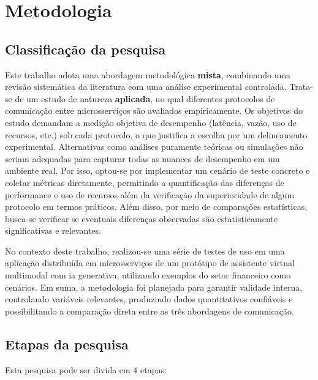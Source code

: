 \chapter{Metodologia}
\label{ch:4metodologia}

\section{Classificação da pesquisa}

Este trabalho adota uma abordagem metodológica \textbf{mista}, combinando uma revisão sistemática da literatura com uma análise experimental controlada. Trata-se de um estudo de natureza \textbf{aplicada}, no qual diferentes protocolos de comunicação entre microsserviços são avaliados empiricamente. Os objetivos do estudo demandam a medição objetiva de desempenho (latência, vazão, uso de recursos, etc.) sob cada protocolo, o que justifica a escolha por um delineamento experimental. Alternativas como análises puramente teóricas ou simulações não seriam adequadas para capturar todas as nuances de desempenho em um ambiente real. Por isso, optou-se por implementar um cenário de teste concreto e coletar métricas diretamente, permitindo a quantificação das diferenças de performance e uso de recursos além da verificação da superioridade de algum protocolo em termos práticos. Além disso, por meio de comparações estatísticas, busca-se verificar se eventuais diferenças observadas são estatisticamente significativas e relevantes.

No contexto deste trabalho, realizou-se uma série de testes de uso em uma aplicação distribuída em microsserviços de um protótipo de assistente virtual multimodal com \acrfull{ia} generativa, utilizando exemplos do setor financeiro como cenários. Em suma, a metodologia foi planejada para garantir validade interna, controlando variáveis relevantes, produzindo dados quantitativos confiáveis e possibilitando a comparação direta entre as três abordagens de comunicação.

\section{Etapas da pesquisa}
Esta pesquisa pode ser divida em 4 etapas:

